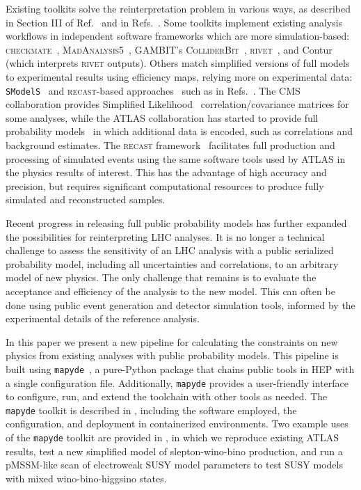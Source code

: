 \documentclass{article}
\newcommand{\mapyde}{\texttt{mapyde}}
\newcommand{\recast}{\textsc{recast}}
\begin{document}
Existing toolkits solve the reinterpretation problem in various ways, as described in Section III of Ref.~\cite{LHCReinterpretationForum:2020xtr} and in Refs.~\cite{Cranmer:2021urp,Bailey:2022tdz}.  Some toolkits implement existing analysis workflows in independent software frameworks which are more simulation-based: \textsc{checkmate}~\cite{Dercks:2016npn}, \textsc{MadAnalysis5}~\cite{Conte:2018vmg,Araz:2020lnp,Dumont:2014tja}, \textsc{GAMBIT}'s \textsc{ColliderBit}~\cite{GAMBIT:2017yxo,Kvellestad:2019vxm,GAMBIT:2018gjo,zenodo:gambit}, \textsc{rivet}~\cite{Bierlich:2019rhm,Bierlich:2020wms}, and Contur~\cite{Buckley:2021neu} (which interprets \textsc{rivet} outputs).  Others match simplified versions of full models to experimental results using efficiency maps, relying more on experimental data: \texttt{SModelS}~\cite{Alguero:2021dig} and \recast-based approaches~\cite{Cranmer:2010hk} such as in Refs.~\cite{zenodo:LHCreinterpretation,llpRepo,RECAST1,RECAST2,RECAST3}.  The CMS collaboration provides Simplified Likelihood~\cite{CMS-NOTE-2017-001} correlation/covariance matrices for some analyses, while the ATLAS collaboration has started to provide full probability models~\cite{ATL-PHYS-PUB-2019-029} in which additional data is encoded, such as correlations and background estimates. The \recast{} framework~\cite{Cranmer:2010hk} facilitates full production and processing of simulated events using the same software tools used by ATLAS in the physics results of interest.  This has the advantage of high accuracy and precision, but requires significant computational resources to produce fully simulated and reconstructed samples.

Recent progress in releasing full public probability models has further expanded the possibilities for reinterpreting LHC analyses.  It is no longer a technical challenge to assess the sensitivity of an LHC analysis with a public serialized probability model, including all uncertainties and correlations, to an arbitrary model of new physics.  The only challenge that remains is to evaluate the acceptance and efficiency of the analysis to the new model.  This can often be done using public event generation and detector simulation tools, informed by the experimental details of the reference analysis.

In this paper we present a new pipeline for calculating the constraints on new physics from existing analyses with public probability models. This pipeline is built using \mapyde~\cite{mapyde}, a pure-Python package that chains public tools in HEP with a single configuration file. Additionally, \mapyde{} provides a user-friendly interface to configure, run, and extend the toolchain with other tools as needed.  The \mapyde{} toolkit is described in , including the software employed, the configuration, and deployment in containerized environments.  Two example uses of the \mapyde{} toolkit are provided in , in which we reproduce existing ATLAS results, test a new simplified model of slepton-wino-bino production, and run a pMSSM-like scan of electroweak SUSY model parameters to test SUSY models with mixed wino-bino-higgsino states.
\end{document}

